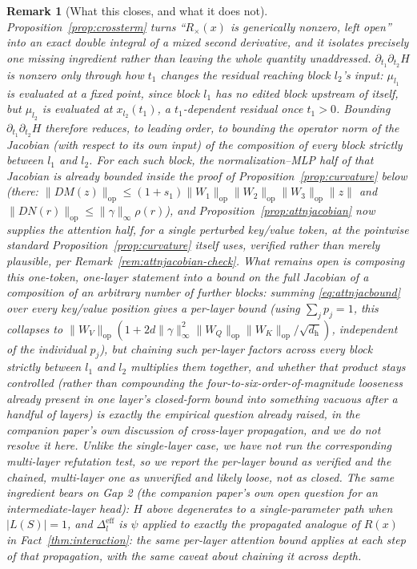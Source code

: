 \documentclass[11pt,a4paper]{article}
\newtheorem{remark}{Remark}
\begin{document}
\begin{remark}[What this closes, and what it does not]
\label{rem:crossterm-gap}
Proposition~\ref{prop:crossterm} turns ``$R_\times(x)$ is generically
nonzero, left open'' into an exact double integral of a mixed second
derivative, and it isolates precisely one missing ingredient rather than
leaving the whole quantity unaddressed. $\partial_{t_1}\partial_{t_2}H$ is
nonzero only through how $t_1$ changes the residual reaching block $l_2$'s
input: $\mu_{l_1}$ is evaluated at a fixed point, since block $l_1$ has no
edited block upstream of itself, but $\mu_{l_2}$ is evaluated at
$x_{l_2}(t_1)$, a $t_1$-dependent residual once $t_1>0$. Bounding
$\partial_{t_1}\partial_{t_2}H$ therefore reduces, to leading order, to
bounding the operator norm of the Jacobian (with respect to its own
input) of the composition of every block strictly between $l_1$ and
$l_2$. For each such block, the normalization--MLP half of that Jacobian is
already bounded inside the proof of Proposition~\ref{prop:curvature} below
(there: $\|DM(z)\|_{\mathrm{op}}\le(1+s_1)\|W_1\|_{\mathrm{op}}
\|W_2\|_{\mathrm{op}}\|W_3\|_{\mathrm{op}}\|z\|$ and
$\|DN(r)\|_{\mathrm{op}}\le\|\gamma\|_\infty\rho(r)$), and
Proposition~\ref{prop:attnjacobian} now supplies the attention half, for a
single perturbed key/value token, at the pointwise standard
Proposition~\ref{prop:curvature} itself uses, verified rather than merely
plausible, per Remark~\ref{rem:attnjacobian-check}. What remains open is
composing this one-token, one-layer statement into a bound on the full
Jacobian of a composition of an arbitrary number of further blocks: summing
\eqref{eq:attnjacbound} over every key/value position gives a
per-layer bound (using $\sum_jp_j=1$, this collapses to
$\|W_V\|_{\mathrm{op}}(1+2d\|\gamma\|_\infty^2\|W_Q\|_{\mathrm{op}}
\|W_K\|_{\mathrm{op}}/\sqrt{d_{\mathrm h}})$, independent of the individual
$p_j$), but chaining such per-layer factors across every block strictly
between $l_1$ and $l_2$ multiplies them together, and whether that product
stays controlled (rather than compounding the four-to-six-order-of-magnitude
looseness already present in one layer's closed-form bound into something
vacuous after a handful of layers) is exactly the empirical question already
raised, in the companion paper's own discussion of cross-layer propagation,
and we do not resolve it here. Unlike the single-layer case, we have not run
the corresponding multi-layer refutation test, so we report the per-layer
bound as verified and the chained, multi-layer one as unverified and likely
loose, not as closed. The same ingredient bears on Gap 2 (the companion
paper's own open question for an intermediate-layer head): $H$ above
degenerates to a single-parameter path when $|L(S)|=1$, and
$\Delta_l^{\mathrm{eff}}$ is $\psi$ applied to exactly the propagated
analogue of $R(x)$ in Fact~\ref{thm:interaction}: the same per-layer
attention bound applies at each step of that propagation, with the same
caveat about chaining it across depth.
\end{remark}
\end{document}
